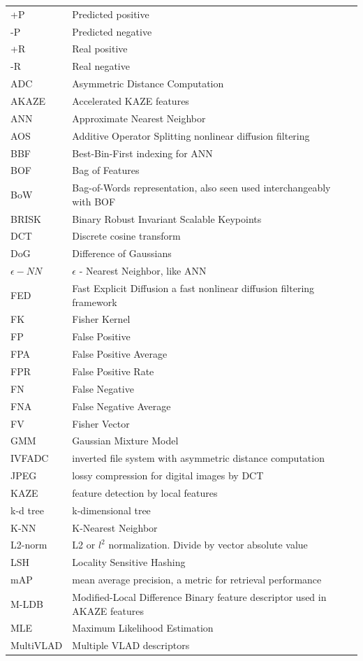 \documentclass[english,12pt,a4paper,pdftex,elec,utf8, table]{aaltothesis}
\begin{document}
\begin{tabular}{ll}
  +P & Predicted positive\\
  -P & Predicted negative\\
  +R & Real positive\\
  -R & Real negative\\
  ADC & Asymmetric Distance Computation\\
  AKAZE & Accelerated KAZE features\\
  ANN & Approximate Nearest Neighbor\\
  AOS & Additive Operator Splitting nonlinear diffusion filtering\\
  BBF & Best-Bin-First indexing for ANN\\
  BOF & Bag of Features\\
  BoW & Bag-of-Words representation, also seen used interchangeably with BOF\\
  BRISK & Binary Robust Invariant Scalable Keypoints\\
  DCT & Discrete cosine transform\\
  DoG & Difference of Gaussians\\
  $\epsilon -NN$ & $\epsilon$ - Nearest Neighbor, like ANN\\
  FED & Fast Explicit Diffusion a fast nonlinear diffusion filtering framework\\
  FK & Fisher Kernel\\
  FP & False Positive\\
  FPA & False Positive Average\\
  FPR & False Positive Rate\\
  FN & False Negative\\
  FNA & False Negative Average\\
  FV & Fisher Vector\\
  GMM & Gaussian Mixture Model\\
  IVFADC & inverted file system with asymmetric distance computation\\
  JPEG & lossy compression for digital images by DCT\\
  KAZE & feature detection by local features\\
  k-d tree & k-dimensional tree\\
  K-NN & K-Nearest Neighbor\\
  L2-norm & L2 or $l^2$ normalization. Divide by vector absolute value\\
  LSH & Locality Sensitive Hashing\\
  mAP & mean average precision, a metric for retrieval performance\\
  M-LDB & Modified-Local Difference Binary feature descriptor used in AKAZE features\\
  MLE & Maximum Likelihood Estimation\\
  MultiVLAD & Multiple VLAD descriptors\\
\end{tabular}
\end{document}
